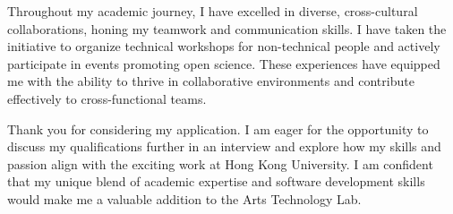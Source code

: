 \documentclass[11pt, a4paper]{awesome-cv}
\begin{document}
\begin{cvletter}
Throughout my academic journey, I have excelled in diverse, cross-cultural collaborations, honing my teamwork and communication skills. I have taken the initiative to organize technical workshops for non-technical people and actively participate in events promoting open science. These experiences have equipped me with the ability to thrive in collaborative environments and contribute effectively to cross-functional teams.

Thank you for considering my application. I am eager for the opportunity to discuss my qualifications further in an interview and explore how my skills and passion align with the exciting work at Hong Kong University. I am confident that my unique blend of academic expertise and software development skills would make me a valuable addition to the Arts Technology Lab.

\end{cvletter}


\makeletterclosing
\end{document}
